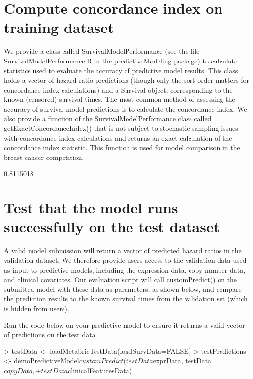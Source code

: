 \documentclass[10pt]{article}
\begin{document}
\section{Compute concordance index on training dataset}
We provide a class called SurvivalModelPerformance (see the file SurvivalModelPerformance.R in the predictiveModeling package) to calculate statistics used to evaluate the accuracy of predictive model results. This class holds a vector of hazard ratio predictions (though only the sort order matters for concordance index calculations) and a Survival object, corresponding to the known (censored) survival times. The most common method of assessing the accuracy of survival model predictions is to calculate the concordance index. We also provide a function of the SurvivalModelPerformance class called getExactConcordanceIndex() that is not subject to stochastic sampling issues with concordance index calculations and returns an exact calculation of the concordance index statistic. This function is used for model comparison in the breast cancer competition.
\begin{Schunk}
\begin{Soutput}
[1] 0.8115018
\end{Soutput}
\end{Schunk}

\section{Test that the model runs successfully on the test dataset}
A valid model submission will return a vector of predicted hazard ratios in the validation dataset. We therefore provide users access to the validation data used as input to predictive models, including the expression data, copy number data, and clinical covariates. Our evaluation script will call customPredict() on the submitted model with these data as parameters, as shown below, and compare the prediction results to the known survival times from the validation set (which is hidden from users).

Run the code below on your predictive model to ensure it returns a valid vector of predictions on the test data.

\begin{Schunk}
\begin{Sinput}
> testData <- loadMetabricTestData(loadSurvData=FALSE)
> testPredictions <- demoPredictiveModel$customPredict(testData$exprData, testData$copyData,
+                                                      testData$clinicalFeaturesData)
\end{Sinput}
\end{Schunk}
\end{document}
